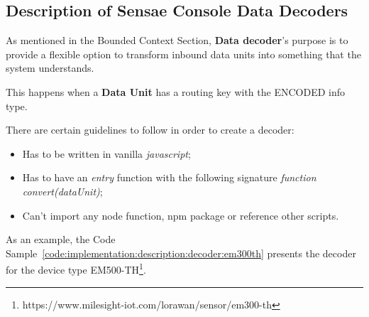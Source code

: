 \subsection{Description of Sensae Console Data Decoders}
\label{subsec:implementation:description:decoder}

As mentioned in the  Bounded Context Section, \textbf{Data decoder}'s purpose is to provide a flexible option to transform inbound data units into something that the system understands.

This happens when a \textbf{Data Unit} has a routing key with the ENCODED info type.

There are certain guidelines to follow in order to create a decoder:

\begin{itemize}
    \item Has to be written in vanilla \textit{javascript};
    \item Has to have an \textit{entry} function with the following signature \textit{function convert(dataUnit)};
    \item Can't import any node function, npm package or reference other scripts.
\end{itemize}

As an example, the Code Sample~\ref{code:implementation:description:decoder:em300th} presents the decoder for the device type EM500-TH\footnote{https://www.milesight-iot.com/lorawan/sensor/em300-th}.

